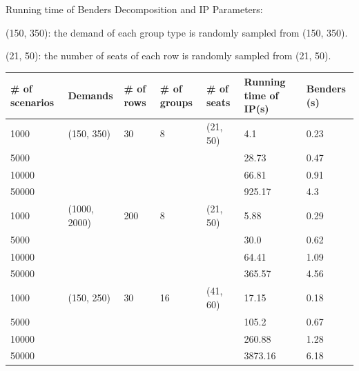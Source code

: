 \begin{frame}{Running time of Benders Decomposition and IP}
  Parameters: 

  (150, 350): the demand of each group type is randomly sampled from (150, 350).

  (21, 50): the number of seats of each row is randomly sampled from (21, 50).
  \tiny
  \begin{table}[ht]
    \centering
    \begin{tabular}{|l|l|l|l|l|l|l|}
    \hline
    \# of scenarios & Demands & \# of rows & \# of groups & \# of seats & Running time of IP(s) & Benders (s) \\
    \hline
    1000  & (150, 350) & 30 & 8 & (21, 50) & 4.1  & 0.23 \\
    5000  &            &    &   &         & 28.73 & 0.47  \\
    10000 &            &    &   &         & 66.81  & 0.91 \\
    50000 &            &    &   &         & 925.17 & 4.3 \\
    \hline
    1000  & (1000, 2000) & 200 & 8 & (21, 50) & 5.88 & 0.29 \\
    5000  &              &     &   &          & 30.0 & 0.62 \\
    10000 &              &     &   &          & 64.41 & 1.09 \\
    50000 &              &     &   &          & 365.57 & 4.56\\
    \hline
    1000  & (150, 250) & 30 & 16 & (41, 60) & 17.15  & 0.18 \\
    5000  &            &    &    &          & 105.2  & 0.67 \\
    10000 &            &    &    &          & 260.88 & 1.28 \\
    50000 &            &    &    &          & 3873.16 & 6.18 \\
    \hline
    \end{tabular}
  \end{table}
\end{frame}


